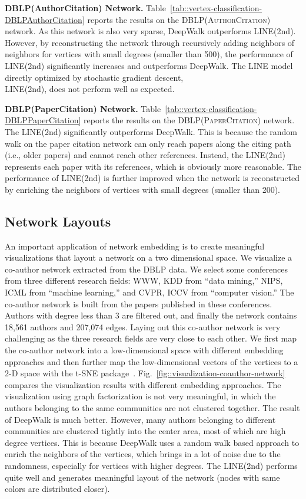 \documentclass{sig-alternate-2013}
\begin{document}
\noindent \textbf{DBLP(AuthorCitation) Network.}
Table~\ref{tab::vertex-classification-DBLPAuthorCitation} reports the results on the \textsc{DBLP(AuthorCitation)} network. As this network is also very sparse, DeepWalk outperforms LINE(2nd). However, by reconstructing the network through recursively adding neighbors of neighbors for vertices with small degrees (smaller than 500), the performance of LINE(2nd) significantly increases and outperforms DeepWalk. The LINE model directly optimized by stochastic gradient descent, \\ LINE(2nd), does not perform well as expected. 

\noindent \textbf{DBLP(PaperCitation) Network.}
Table~\ref{tab::vertex-classification-DBLPPaperCitation} reports the results on the \textsc{DBLP(PaperCitation)} network. The LINE(2nd) significantly outperforms DeepWalk. This is because the random walk on the paper citation network can only reach papers along the citing path (i.e., older papers) and cannot reach other references. Instead, the LINE(2nd) represents each paper with its references, which is obviously more reasonable. The performance of LINE(2nd) is further improved when the network is reconstructed by enriching the neighbors of vertices with small degrees (smaller than 200).  

\subsection{Network Layouts}

An important application of network embedding is to create meaningful visualizations that layout a network on a two dimensional space. We visualize a co-author network extracted from the DBLP data. We select some conferences from three different research fields: WWW, KDD from ``data mining,'' NIPS, ICML from ``machine learning,'' and CVPR, ICCV from ``computer vision.'' The co-author network is built from the papers published in these conferences. Authors with degree less than 3 are filtered out, and finally the network contains 18,561 authors and 207,074 edges. Laying out this co-author network is very challenging as the three research fields are very close to each other. We first map the co-author network into a low-dimensional space with different embedding approaches and then further map the low-dimensional vectors of the vertices to a 2-D space with the t-SNE package~\cite{van2008visualizing}. Fig.~\ref{fig::visualization-coauthor-network} compares the visualization results with different embedding approaches. The visualization using graph factorization is not very meaningful, in which the authors belonging to the same communities are not clustered together. The result of DeepWalk is much better. However, many authors belonging to different communities are clustered tightly into the center area, most of which are high degree vertices. This is because DeepWalk uses a random walk based approach to enrich the neighbors of the vertices, which brings in a lot of noise due to the randomness, especially for vertices with higher degrees. The LINE(2nd) performs quite well and generates meaningful layout of the network (nodes with same colors are distributed closer).
\end{document}
